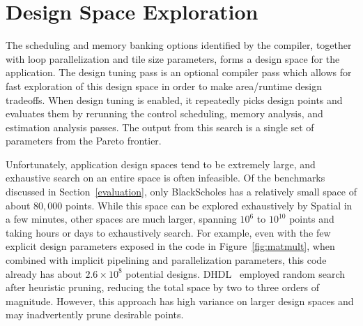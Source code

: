 

\section{Design Space Exploration}
\label{dse}

The scheduling and memory banking options identified by the compiler, together with loop parallelization and tile size parameters, forms a design space for the application.
The design tuning pass is an optional compiler pass which allows for fast exploration of this design space in order to make area/runtime design tradeoffs.
When design tuning is enabled, it repeatedly picks design points and evaluates them by rerunning the control scheduling, memory analysis, and estimation analysis passes. The output from this search is a single set of parameters from the Pareto frontier.

Unfortunately, application design spaces tend to be extremely large, and exhaustive search on an entire space is often infeasible. Of the benchmarks discussed in Section~\ref{evaluation},
only BlackScholes has a relatively small space of about $80,000$ points. While this space can be explored exhaustively by Spatial in a few minutes, other spaces are much larger, spanning $10^6$ to $10^{10}$ points and
taking hours or days to exhaustively search. For example, even with the few explicit design parameters exposed in the code in Figure~\ref{fig:matmult}, when combined with implicit pipelining and parallelization parameters, this code already has about $2.6\times10^8$ potential designs.
DHDL~\cite{dhdl} employed random search after heuristic pruning, reducing the total space by two to three orders of magnitude. However, this approach has high variance on larger design spaces and may inadvertently prune desirable points.

